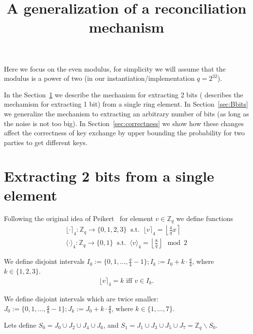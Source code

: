 \documentclass[12pt]{article}
\newcommand{\Z}{\mathbb{Z}}
\begin{document}
\title{A generalization of a reconciliation mechanism}
\maketitle

Here we focus on the even modulus, for simplicity we will assume that the modulus is a power of two (in our instantiation/implementation $q = 2^{32}$).

In the Section~\ref{sec:2bits} we describe the mechanism for extracting 2 bits (\cite{P14} describes the mechamism for extracting 1 bit) from a single ring element. In Section~\ref{sec:Bbits} we generalize the mechanism to extracting an arbitrary number of bits (as long as the noise is not too big). In Section~\ref{sec:correctness} we show how these changes affect the correctness of key exchange by upper bounding the probability for two parties to get different keys.

\section{Extracting 2 bits from a single element}
\label{sec:2bits}
Following the original idea of Peikert~\cite{P14} for element $v \in \Z_q$ we define functions
\begin{align*}
\lfloor \cdot \rceil_4: \Z_q \rightarrow \{0, 1, 2, 3\}\;\;\text{s.t.}\;\; \lfloor v \rceil_4 = \left\lfloor \frac{4}{q} x\right\rceil\\
\langle \cdot \rangle_4: \Z_q \rightarrow \{0, 1\}\;\;\text{s.t.}\;\; \langle v \rangle_4 = \left\lfloor \frac{8}{q} \right\rfloor \mod 2
\end{align*}

We define disjoint intervals $I_0 := \{0, 1, \ldots, \frac{q}{4} - 1\}; I_k := I_0 + k \cdot \frac{q}{4}$, where $k \in \{1, 2, 3\}$.
\begin{align*}
\lfloor v \rceil_4 = k\text{ iff }v \in I_k.
\end{align*}

We define disjoint intervals which are twice smaller: $J_0 := \{0, 1, \ldots, \frac{q}{8} - 1\}; J_k := J_0 + k \cdot \frac{q}{8}$, where $k \in \{1, \ldots, 7\}$.

Lets define $S_0 = J_0 \cup J_2 \cup J_4 \cup J_6$, and $S_1 = J_1 \cup J_3 \cup J_5 \cup J_7 = \Z_q \backslash S_0$.
\end{document}
